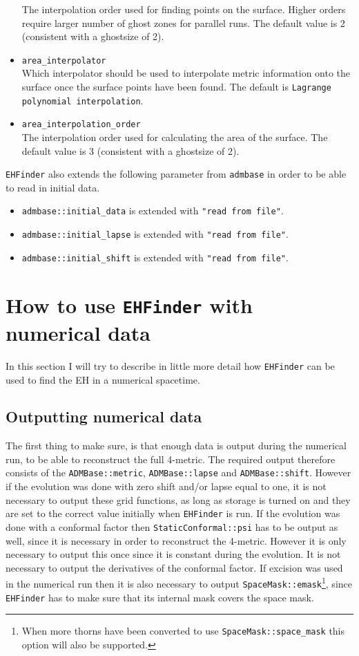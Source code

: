 \begin{itemize}
  The interpolation order used for finding points on the surface. Higher
  orders require larger number of ghost zones for parallel runs. The default
  value is 2 (consistent with a ghostsize of 2).
\item {\tt area\_interpolator} \\
  Which interpolator should be used to interpolate metric information onto the
  surface once the surface points have been found. The default is
  {\tt Lagrange polynomial interpolation}.
\item {\tt area\_interpolation\_order} \\
  The interpolation order used for calculating the area of the surface.
  The default value is 3 (consistent with a ghostsize of 2).
\end{itemize}
{\tt EHFinder} also extends the following parameter from {\tt admbase} in order
to be able to read in initial data.
\begin{itemize}
\item {\tt admbase::initial\_data} is extended with {\tt "read from file"}.
\item {\tt admbase::initial\_lapse} is extended with {\tt "read from file"}.
\item {\tt admbase::initial\_shift} is extended with {\tt "read from file"}.
\end{itemize}
\section{How to use {\tt EHFinder} with numerical data}
\label{AEIThorns_EHFinder_UseThorn}
In this section I will try to describe in little more detail how {\tt EHFinder}
can be used to find the EH in a numerical spacetime.

\subsection{Outputting numerical data}
The first thing to make sure, is that enough data is output during the
numerical run, to be able to reconstruct the full 4-metric. The
required output therefore consists of the {\tt ADMBase::metric},
{\tt ADMBase::lapse} and {\tt ADMBase::shift}. However if the evolution was
done with zero shift and/or lapse equal to one, it is not necessary to output
these grid functions, as long as storage is turned on and they are set to the
correct value initially when {\tt EHFinder} is run. If the evolution was done
with a conformal factor then {\tt StaticConformal::psi} has to be output as
well, since it is necessary in order to reconstruct the 4-metric. However it
is only necessary to output this once since it is constant during the evolution.
It is not necessary to output the derivatives of the conformal factor. If
excision was used in the numerical run then it is also necessary to output 
{\tt SpaceMask::emask}\footnote{When more thorns have been converted to use
{\tt SpaceMask::space\_mask} this option will also be supported.}, since
{\tt EHFinder} has to make sure that its internal mask covers the space mask.

